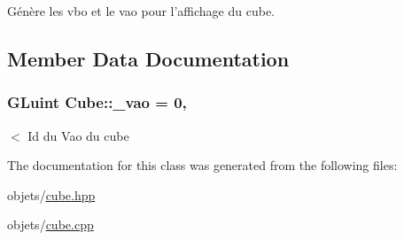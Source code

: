 Génère les vbo et le vao pour l'affichage du cube. 



\subsection{Member Data Documentation}
\hypertarget{class_cube_ae474ca8293842dd9ac83a8c606991eac}{
\subsubsection[{\+\_\+vao}]{\setlength{\rightskip}{0pt plus 5cm}G\+Luint Cube\+::\+\_\+vao = 0\hspace{0.3cm}{\ttfamily [static]}, {\ttfamily [private]}}}\label{class_cube_ae474ca8293842dd9ac83a8c606991eac}
$<$ Id du Vao du cube 

The documentation for this class was generated from the following files\+:\begin{DoxyCompactItemize}
\item 
objets/\hyperlink{cube_8hpp}{cube.\+hpp}\item 
objets/\hyperlink{cube_8cpp}{cube.\+cpp}\end{DoxyCompactItemize}
